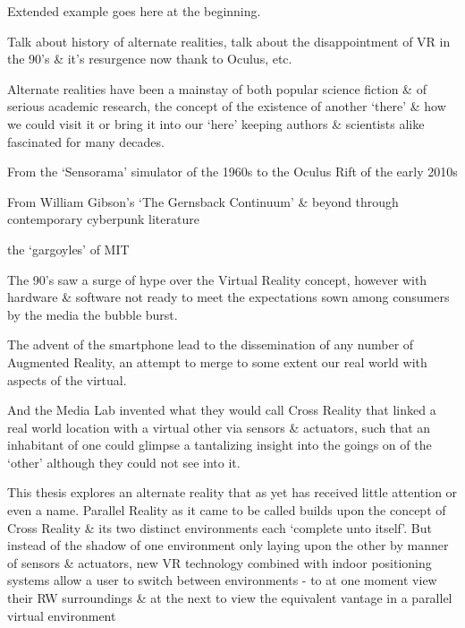 Extended example goes here at the beginning.




Talk about history of alternate realities, talk about the disappointment of VR in the 90's \& it's resurgence now thank to Oculus, etc.






Alternate realities have been a mainstay of both popular science fiction \& of serious academic research, the concept of the existence of another `there' \& how we could visit it or bring it into our `here'
keeping authors \& scientists alike fascinated for many decades.

From the `Sensorama' simulator of the 1960s to the Oculus Rift of the early 2010s

From William Gibson's `The Gernsback Continuum' \& beyond through contemporary cyberpunk literature

the `gargoyles' of MIT


The 90's saw a surge of hype over the Virtual Reality concept, however with hardware \& software not ready to meet the expectations sown among consumers by the media the bubble burst.

The advent of the smartphone lead to the dissemination of any number of Augmented Reality, an attempt to merge to some extent our real world with aspects of the virtual.


And the Media Lab invented what they would call Cross Reality that linked a real world location with a virtual other via sensors \& actuators, such that an inhabitant of one could glimpse a tantalizing insight into the goings on of the `other' although they could not see into it.

This thesis explores an alternate reality that as yet has received little attention or even a name. Parallel Reality as it came to be called builds upon the concept of Cross Reality \& its two distinct environments each `complete unto itself'. But instead of the shadow of one environment only laying upon the other by manner of sensors \& actuators, new VR technology combined with indoor positioning systems allow a user to switch between environments - to at one moment view their RW surroundings \& at the next to view the equivalent vantage in a parallel virtual environment


